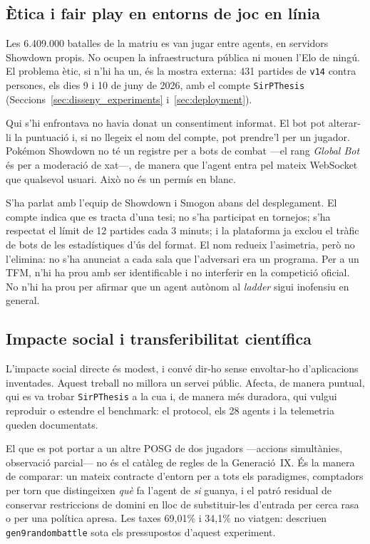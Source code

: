 \subsection{Ètica i fair play en entorns de joc en línia}

Les 6.409.000 batalles de la matriu es van jugar entre agents, en servidors Showdown propis. No ocupen la infraestructura pública ni mouen l'Elo de ningú. El problema ètic, si n'hi ha un, és la mostra externa: 431 partides de \texttt{v14} contra persones, els dies 9 i 10 de juny de 2026, amb el compte \texttt{SirPThesis} (Seccions~\ref{sec:disseny_experiments} i~\ref{sec:deployment}).

Qui s'hi enfrontava no havia donat un consentiment informat. El bot pot alterar-li la puntuació i, si no llegeix el nom del compte, pot prendre'l per un jugador. Pokémon Showdown no té un registre per a bots de combat ---el rang \emph{Global Bot} és per a moderació de xat---, de manera que l'agent entra pel mateix WebSocket que qualsevol usuari. Això no és un permís en blanc.

S'ha parlat amb l'equip de Showdown i Smogon abans del desplegament. El compte indica que es tracta d'una tesi; no s'ha participat en tornejos; s'ha respectat el límit de 12 partides cada 3 minuts; i la plataforma ja exclou el tràfic de bots de les estadístiques d'ús del format. El nom redueix l'asimetria, però no l'elimina: no s'ha anunciat a cada sala que l'adversari era un programa. Per a un TFM, n'hi ha prou amb ser identificable i no interferir en la competició oficial. No n'hi ha prou per afirmar que un agent autònom al \emph{ladder} sigui inofensiu en general.

\subsection{Impacte social i transferibilitat científica}

L'impacte social directe és modest, i convé dir-ho sense envoltar-ho d'aplicacions inventades. Aquest treball no millora un servei públic. Afecta, de manera puntual, qui es va trobar \texttt{SirPThesis} a la cua i, de manera més duradora, qui vulgui reproduir o estendre el benchmark: el protocol, els 28 agents i la telemetria queden documentats.

El que es pot portar a un altre POSG de dos jugadors ---accions simultànies, observació parcial--- no és el catàleg de regles de la Generació~IX. És la manera de comparar: un mateix contracte d'entorn per a tots els paradigmes, comptadors per torn que distingeixen \emph{què} fa l'agent de \emph{si} guanya, i el patró residual de conservar restriccions de domini en lloc de substituir-les d'entrada per cerca rasa o per una política apresa. Les taxes 69,01\% i 34,1\% no viatgen: descriuen \texttt{gen9randombattle} sota els pressupostos d'aquest experiment.

